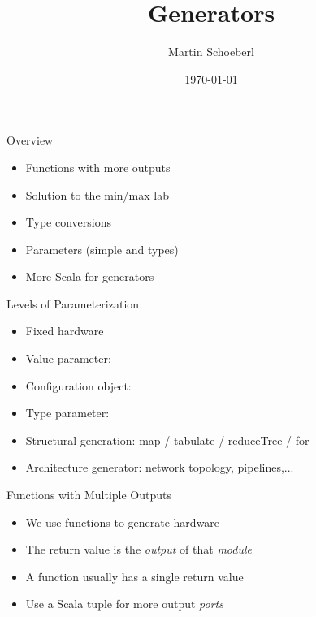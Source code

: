 

\newif\ifbook


\usepackage{tikz}
\usetikzlibrary{positioning, arrows.meta}


\title{Generators}
\author{Martin Schoeberl}
\date{\today}



\begin{frame}
\titlepage
\end{frame}

\begin{frame}[fragile]{Overview}
\begin{itemize}
\item Functions with more outputs
\item Solution to the min/max lab
\item Type conversions
\item Parameters (simple and types)
\item More Scala for generators
\end{itemize}
\end{frame}

\begin{frame}[fragile]{Levels of Parameterization}
\begin{itemize}
\item Fixed hardware
\item Value parameter: 
\item Configuration object: 
\item Type parameter: 
\item Structural generation:
    map / tabulate / reduceTree / for
\item Architecture generator:
    network topology, pipelines,...
\end{itemize}
\end{frame}

\begin{frame}[fragile]{Functions with Multiple Outputs}
\begin{itemize}
\item We use functions to generate hardware
\item The return value is the \emph{output} of that \emph{module}
\item A function usually has a single return value
\item Use a Scala tuple for more output \emph{ports}
\end{itemize}
\end{frame}

